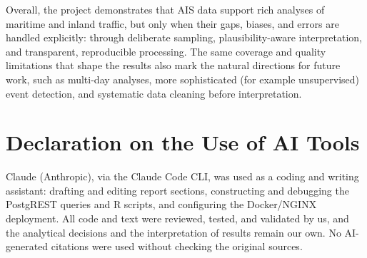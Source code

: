 \documentclass[10pt,a4paper]{article}
\begin{document}
Overall, the project demonstrates that AIS data support rich analyses of maritime and
inland traffic, but only when their gaps, biases, and errors are handled explicitly:
through deliberate sampling, plausibility-aware interpretation, and transparent,
reproducible processing. The same coverage and quality limitations that shape the
results also mark the natural directions for future work, such as multi-day analyses,
more sophisticated (for example unsupervised) event detection, and systematic data
cleaning before interpretation.


\section {Declaration on the Use of AI Tools}

Claude (Anthropic), via the Claude Code CLI, was used as a coding and writing
assistant: drafting and editing report sections, constructing and debugging the
PostgREST queries and R scripts, and configuring the Docker/NGINX deployment.
All code and text were reviewed, tested, and validated by us, and the analytical
decisions and the interpretation of results remain our own. No AI-generated
citations were used without checking the original sources.

\end{document}
